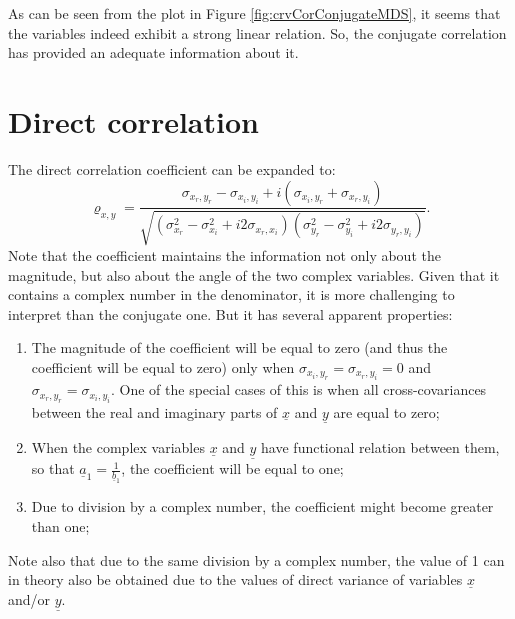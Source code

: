 \documentclass[
]{book}
\begin{document}
As can be seen from the plot in Figure \ref{fig:crvCorConjugateMDS}, it seems that the variables indeed exhibit a strong linear relation. So, the conjugate correlation has provided an adequate information about it.

\hypertarget{correlationDirect}{%
\section{Direct correlation}\label{correlationDirect}}

The direct correlation coefficient can be expanded to:
\begin{equation}
    {\varrho}_{x,y} = \frac{\sigma_{x_r, y_r} - \sigma_{x_i, y_i} + i (\sigma_{x_i, y_r} + \sigma_{x_r, y_i})}{\sqrt{(\sigma_{x_r}^2 - \sigma_{x_i}^2 + i2 \sigma_{x_r,x_i})(\sigma_{y_r}^2 - \sigma_{y_i}^2 + i2 \sigma_{y_r,y_i})}}.
    \label{eq:correlationPseudoExpanded}
\end{equation}
Note that the coefficient maintains the information not only about the magnitude, but also about the angle of the two complex variables. Given that it contains a complex number in the denominator, it is more challenging to interpret than the conjugate one. But it has several apparent properties:

\begin{enumerate}
\def\labelenumi{\arabic{enumi}.}
\item
  The magnitude of the coefficient will be equal to zero (and thus the coefficient will be equal to zero) only when \(\sigma_{x_i,y_r}=\sigma_{x_r,y_i}=0\) and \(\sigma_{x_r,y_r}=\sigma_{x_i,y_i}\). One of the special cases of this is when all cross-covariances between the real and imaginary parts of \(\underline{x}\) and \(\underline{y}\) are equal to zero;
\item
  When the complex variables \(\underline{x}\) and \(\underline{y}\) have functional relation between them, so that \(\underline{a}_1 = \frac{1}{\underline{b}_1}\), the coefficient will be equal to one;
\item
  Due to division by a complex number, the coefficient might become greater than one;
\end{enumerate}

Note also that due to the same division by a complex number, the value of 1 can in theory also be obtained due to the values of direct variance of variables \(\underline{x}\) and/or \(\underline{y}\).
\end{document}
